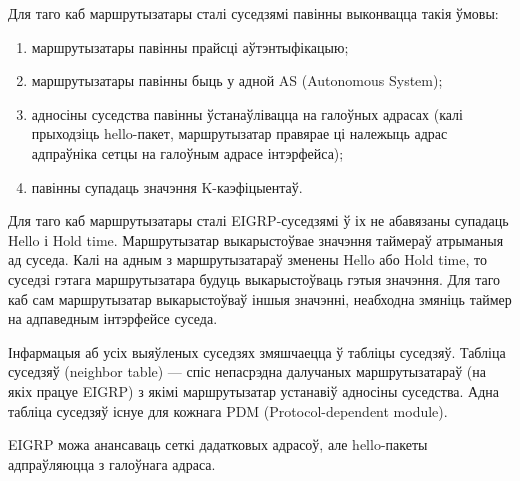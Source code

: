 Для таго каб маршрутызатары сталі суседзямі павінны выконвацца такія ўмовы:
\begin{enumerate}
    \item маршрутызатары павінны прайсці аўтэнтыфікацыю;
    \item маршрутызатары павінны быць у адной AS (Autonomous System);
    \item адносіны суседства павінны ўстанаўлівацца на галоўных адрасах (калі прыходзіць hello-пакет, маршрутызатар правярае ці належыць адрас адпраўніка сетцы на галоўным адрасе інтэрфейса);
    \item павінны супадаць значэння K-каэфіцыентаў.
\end{enumerate}

Для таго каб маршрутызатары сталі EIGRP-суседзямі ў іх не абавязаны супадаць Hello і Hold time.
Маршрутызатар выкарыстоўвае значэння таймераў атрыманыя ад суседа.
Калі на адным з маршрутызатараў зменены Hello або Hold time, то суседзі гэтага маршрутызатара будуць выкарыстоўваць гэтыя значэння. Для таго каб сам маршрутызатар выкарыстоўваў іншыя значэнні, неабходна змяніць таймер на адпаведным інтэрфейсе суседа.

Інфармацыя аб усіх выяўленых суседзях змяшчаецца ў табліцы суседзяў.
Табліца суседзяў (neighbor table) --- спіс непасрэдна далучаных маршрутызатараў (на якіх працуе EIGRP) з якімі маршрутызатар устанавіў адносіны суседства. Адна табліца суседзяў існуе для кожнага PDM (Protocol-dependent module).

EIGRP можа анансаваць сеткі дадатковых адрасоў, але hello-пакеты адпраўляюцца з галоўнага адраса.
%
%

